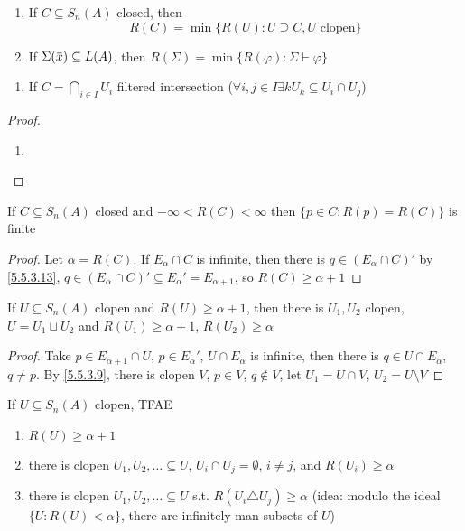 \documentclass[11pt]{article}
\begin{document}
\begin{proposition}[]
\begin{enumerate}
\item If \(C\subseteq S_n(A)\) closed, then
\begin{equation*}
R(C)=\min\{R(U):U\supseteq C,U\text{ clopen}\}
\end{equation*}
\item If \(\Sigma(\barx)\subseteq L(A)\), then \(R(\Sigma)=\min\{R(\varphi):\Sigma\vdash\varphi\}\)
\end{enumerate}


\begin{enumerate}
\item If \(C=\bigcap_{i\in I}U_i\) filtered intersection (\(\forall i,j\in I\exists k U_k\subseteq U_i\cap U_j\))
\end{enumerate}
\end{proposition}

\begin{proof}
\begin{enumerate}
\item 
\end{enumerate}
\end{proof}

\begin{proposition}[]
If \(C\subseteq S_n(A)\) closed and \(-\infty<R(C)<\infty\) then \(\{p\in C:R(p)=R(C)\}\) is finite
\end{proposition}

\begin{proof}
Let \(\alpha=R(C)\). If \(E_\alpha\cap C\) is infinite, then there is \(q\in(E_\alpha\cap C)'\) by \ref{5.5.3.13},
\(q\in(E_\alpha\cap C)'\subseteq E_\alpha'=E_{\alpha+1}\), so \(R(C)\ge\alpha+1\)
\end{proof}

\begin{lemma}[]
If \(U\subseteq S_n(A)\) clopen and \(R(U)\ge\alpha+1\), then there is \(U_1,U_2\) clopen, \(U=U_1\sqcup U_2\)
and \(R(U_1)\ge\alpha+1\), \(R(U_2)\ge\alpha\)
\end{lemma}

\begin{proof}
Take \(p\in E_{\alpha+1}\cap U\), \(p\in E_\alpha'\), \(U\cap E_\alpha\) is infinite, then there
is \(q\in U\cap E_\alpha\), \(q\neq p\). By \ref{5.5.3.9}, there is clopen \(V\), \(p\in V\), \(q\notin V\),
let \(U_1=U\cap V\), \(U_2=U\setminus V\)
\end{proof}

\begin{proposition}[]
If \(U\subseteq S_n(A)\) clopen, TFAE
\begin{enumerate}
\item \(R(U)\ge\alpha+1\)
\item there is clopen \(U_1,U_2,\dots\subseteq U\), \(U_i\cap U_j=\emptyset\), \(i\neq j\),  and \(R(U_i)\ge\alpha\)
\item there is clopen \(U_1,U_2,\dots\subseteq U\) s.t. \(R(U_i\triangle U_j)\ge\alpha\) (idea: modulo the ideal \(\{U:R(U)<\alpha\}\),
there are infinitely man subsets of \(U\))
\end{enumerate}
\end{proposition}
\end{document}
